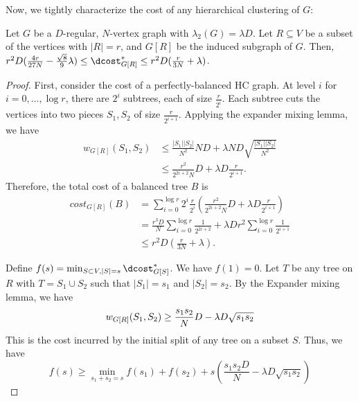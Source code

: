 Now, we tightly characterize the cost of any hierarchical clustering of $G$:
\begin{lem}
    Let $G$ be a $D$-regular, $N$-vertex graph with $\lambda_2(G) = \lambda D$. Let $R \subseteq V$ be a subset of the vertices with $|R| = r$, and $G[R]$ be the induced subgraph of $G$. Then, $r^2 D (\frac{4r}{27N} - \frac{\sqrt{8}}{9}\lambda) \leq \dcost_{G[R]}^* \leq r^2D(\frac{r}{3N} + \lambda)$.
\end{lem}
\begin{proof}
    First, consider the cost of a perfectly-balanced HC graph. At level $i$ for $i = 0, \ldots, \log r$, there are $2^i$ subtrees, each of size $\frac{r}{2^i}$. Each subtree cuts the vertices into two pieces $S_1, S_2$ of size $\frac{r}{2^{i+1}}$. Applying the expander mixing lemma, we have 
    \begin{align*}
        w_{G[R]}(S_1, S_2) &\leq \frac{|S_1||S_2|}{N^2} ND + \lambda ND\sqrt{\frac{|S_1||S_2|}{N^2}} \\
        &\leq \frac{r^2}{2^{2i+2}N}D + \lambda D \frac{r}{2^{i+1}}.
    \end{align*}
    Therefore, the total cost of a balanced tree $B$ is
    \begin{align*}
        cost_{G[R]}(B) &= \sum_{i=0}^{\log r} 2^i \frac{r}{2^i} \left( \frac{r^2}{2^{2i+2}N}D + \lambda D \frac{r}{2^{i+1}} \right) \\
        &= \frac{r^3 D}{N} \sum_{i=0}^{\log r} \frac{1}{2^{2i+2}} + \lambda D r^2 \sum_{i=0}^{\log r} \frac{1}{2^{i+1}} \\
        &\leq r^2D(\frac{r}{3N} + \lambda).
    \end{align*}
    
    Define $f(s) = \min_{S \subset V, |S| = s} \dcost_{G[S]}^*$. We have $f(1) = 0$. Let $T$ be any tree on $R$ with $T = S_1 \cup S_2$ such that $|S_1| = s_1$ and $|S_2| = s_2$. By the Expander mixing lemma, we have
    \[
        w_{G[R]}(S_1, S_2) \geq \frac{s_1s_2}{N} D - \lambda D\sqrt{s_1s_2} \\
    \]
    This is the cost incurred by the initial split of any tree on a subset $S$. Thus, we have
    \[
        f(s) \geq \min_{s_1 + s_2 = s} f(s_1) + f(s_2) + s\left(\frac{s_1s_2D}{N} - \lambda D \sqrt{s_1 s_2}\right)
    \]
\end{proof}

\begin{theorem}

\end{theorem}

